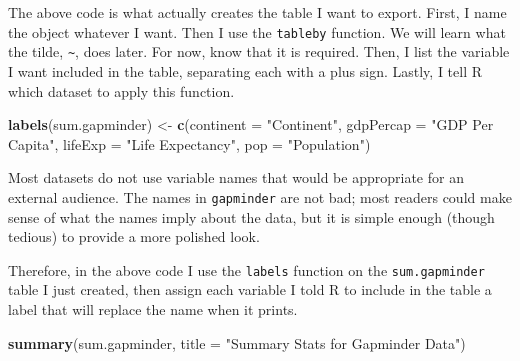 \documentclass[
]{book}
\makeatletter
\newenvironment{Shaded}{\begin{snugshade}}{\end{snugshade}}
\newcommand{\AttributeTok}[1]{\textcolor[rgb]{0.27,0.27,0.27}{#1}}
\newcommand{\FunctionTok}[1]{\textcolor[rgb]{0.27,0.27,0.27}{\textbf{#1}}}
\newcommand{\NormalTok}[1]{#1}
\newcommand{\OtherTok}[1]{\textcolor[rgb]{0.37,0.37,0.37}{#1}}
\newcommand{\StringTok}[1]{\textcolor[rgb]{0.5,0.5,0.5}{#1}}
\newenvironment{kframe}{%
\medskip{}
\setlength{\fboxsep}{.8em}
 \def\at@end@of@kframe{}%
 \ifinner\ifhmode%
  \def\at@end@of@kframe{\end{minipage}}%
  \begin{minipage}{\columnwidth}%
 \fi\fi%
 \def\FrameCommand##1{\hskip\@totalleftmargin \hskip-\fboxsep
 \colorbox{shadecolor}{##1}\hskip-\fboxsep
     \hskip-\linewidth \hskip-\@totalleftmargin \hskip\columnwidth}%
 \MakeFramed {\advance\hsize-\width
   \@totalleftmargin\z@ \linewidth\hsize
   \@setminipage}}%
 {\par\unskip\endMakeFramed%
 \at@end@of@kframe}
\renewenvironment{Shaded}{\begin{kframe}}{\end{kframe}}
\makeatother
\begin{document}
The above code is what actually creates the table I want to export. First, I name the object whatever I want. Then I use the \texttt{tableby} function. We will learn what the tilde, \texttt{\textasciitilde{}}, does later. For now, know that it is required. Then, I list the variable I want included in the table, separating each with a plus sign. Lastly, I tell R which dataset to apply this function.

\begin{Shaded}
\begin{Highlighting}[]
\FunctionTok{labels}\NormalTok{(sum.gapminder) }\OtherTok{\textless{}{-}} \FunctionTok{c}\NormalTok{(}\AttributeTok{continent =} \StringTok{"Continent"}\NormalTok{, }\AttributeTok{gdpPercap =} \StringTok{"GDP Per Capita"}\NormalTok{, }\AttributeTok{lifeExp =} \StringTok{"Life Expectancy"}\NormalTok{, }\AttributeTok{pop =} \StringTok{"Population"}\NormalTok{)}
\end{Highlighting}
\end{Shaded}

Most datasets do not use variable names that would be appropriate for an external audience. The names in \texttt{gapminder} are not bad; most readers could make sense of what the names imply about the data, but it is simple enough (though tedious) to provide a more polished look.

Therefore, in the above code I use the \texttt{labels} function on the \texttt{sum.gapminder} table I just created, then assign each variable I told R to include in the table a label that will replace the name when it prints.

\begin{Shaded}
\begin{Highlighting}[]
\FunctionTok{summary}\NormalTok{(sum.gapminder, }\AttributeTok{title =} \StringTok{"Summary Stats for Gapminder Data"}\NormalTok{)}
\end{Highlighting}
\end{Shaded}
\end{document}

